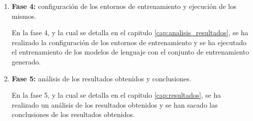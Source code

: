 \begin{enumerate}
    \item \textbf{Fase 4:} configuración de los entornos de entrenamiento y ejecución de
        los mismos.

        En la fase 4, y la cual se detalla en el capitulo \ref{cap:analisis_resultados},
        se ha realizado la configuración de los entornos de entrenamiento y se ha ejecutado
        el entrenamiento de los modelos de lenguaje con el conjunto de entrenamiento generado.

    \item \textbf{Fase 5:} análisis de los resultados obtenidos y conclusiones.
    
        En la fase 5, y la cual se detalla en el capitulo \ref{cap:resultados},
        se ha realizado un análisis de los resultados obtenidos y se han sacado las conclusiones
        de los resultados obtenidos.
\end{enumerate}